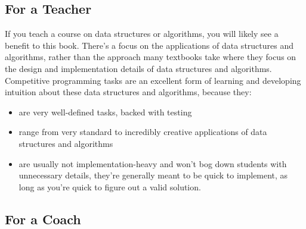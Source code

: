 \subsection*{For a Teacher}

If you teach a course on data structures or algorithms, you will likely see a benefit to this book. There's a focus on the applications of data structures and algorithms, rather than the approach many textbooks take where they focus on the design and implementation details of data structures and algorithms. Competitive programming tasks are an excellent form of learning and developing intuition about these data structures and algorithms, because they:
\begin{itemize}
\item are very well-defined tasks, backed with testing
\item range from very standard to incredibly creative applications of data structures and algorithms
\item are usually not implementation-heavy and won't bog down students with unnecessary details, they're generally meant to be quick to implement, as long as you're quick to figure out a valid solution.
\end{itemize}

\subsection*{For a Coach}

